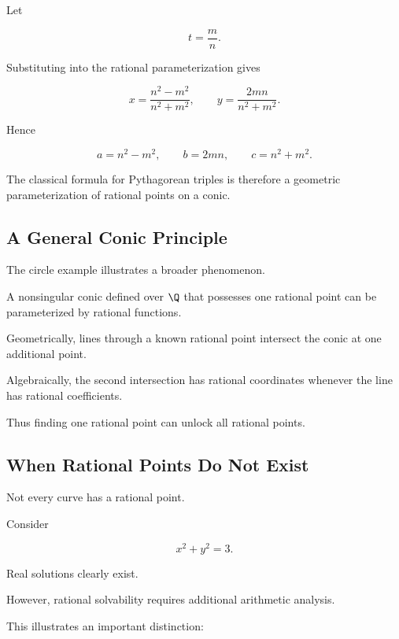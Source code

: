 Let

\[ t=\frac mn. \]

Substituting into the rational parameterization gives

\[
x=\frac{n^2-m^2}{n^2+m^2},
\qquad
y=\frac{2mn}{n^2+m^2}.
\]

Hence

\[
\boxed{
a=n^2-m^2,\qquad
b=2mn,\qquad
c=n^2+m^2.
}
\]

The classical formula for Pythagorean triples is therefore a geometric
parameterization of rational points on a conic.

\subsection{A General Conic Principle}
\label{subsec:general-conic-principle}

The circle example illustrates a broader phenomenon.

\begin{importantbox}
A nonsingular conic defined over \(\Q\) that possesses one rational point can
be parameterized by rational functions.
\end{importantbox}

Geometrically, lines through a known rational point intersect the conic at
one additional point.

Algebraically, the second intersection has rational coordinates whenever the
line has rational coefficients.

Thus finding one rational point can unlock all rational points.

\subsection{When Rational Points Do Not Exist}
\label{subsec:conics-no-rational-points}

Not every curve has a rational point.

Consider

\[ x^2+y^2=3. \]

Real solutions clearly exist.

However, rational solvability requires additional arithmetic analysis.

This illustrates an important distinction:

